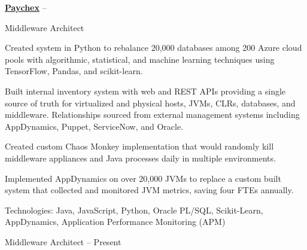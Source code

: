 \documentclass[letterpaper,MMMMyyyy,nonstopmode]{simpleresumecv}
\newif\ifLOCATION
\begin{document}
\begin{Body}
\BigGap

\Entry
\href{http://www.paychex.com}
{\textbf{Paychex}}
\hfill
{} -- 

Middleware Architect %
\ifLOCATION
\hfill
Rochester, New York
\fi

\begin{Detail}
\iffalse
At Paychex I worked with cross-functional teams to build: an inventory system to track hosts, managed VMs, databases, and middleware appliances; machine learning systems to efficiently repack databases and to predict system utilization based on user metrics; a ground-up implementation of the Netflix Chaos Monkey; implemented AppDynamics on over 20,000 JVMs; and a system to collect and monitor JVM metrics and send alerts via SNMP and SMTP.
\fi

\BulletItem
Created system in Python to rebalance 20,000 databases among 200 Azure cloud pools with algorithmic, statistical, and machine learning techniques using TensorFlow, Pandas, and scikit-learn.

\BulletItem
Built internal inventory system with web and REST APIs providing a single source of truth for virtualized and physical hosts, JVMs, CLRs, databases, and middleware. Relationships sourced from external management systems including AppDynamics, Puppet, ServiceNow, and Oracle.

\BulletItem
Created custom Chaos Monkey implementation that would randomly kill middleware appliances and Java processes daily in multiple environments.

\BulletItem
Implemented AppDynamics on over 20,000 JVMs to replace a custom built system that collected and monitored JVM metrics, saving four FTEs annually.

\Gap
Technologies: Java, JavaScript, Python, Oracle PL/SQL, Scikit-Learn, AppDynamics, Application Performance Monitoring (APM)
\end{Detail}

\BigGap

\iffalse %
\Entry
\href{http://www.paychex.com/}
{\textbf{Paychex}}
\ifLOCATION
\hfill 
Rochester, New York
\fi

Middleware Architect
\hfill
{} --
Present


\end{Body}
\end{document}

